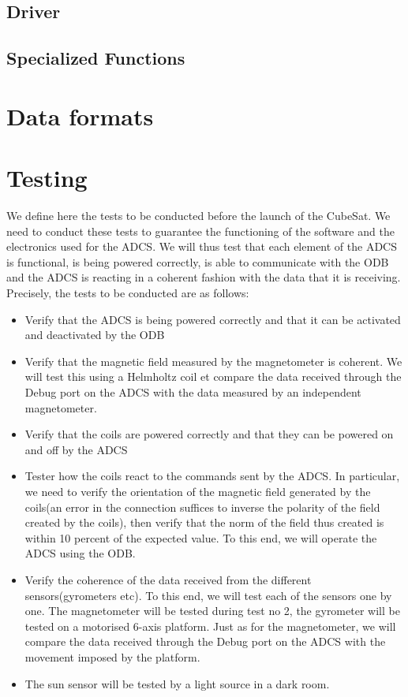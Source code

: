 \documentclass[11pt,a4paper]{report}
\begin{document}
\section{Driver} 

\section{Specialized Functions} 

\chapter{Data formats}\thispagestyle{fancy}

\chapter{Testing}\thispagestyle{fancy} 

We define here the tests to be conducted before the launch of the CubeSat. We need to conduct these tests to guarantee the functioning of the software and the electronics used for the ADCS. We will thus test that each element of the ADCS is functional, is being powered correctly, is able to communicate with the ODB and the ADCS is reacting in a coherent fashion with the data that it is receiving. Precisely, the tests to be conducted are as follows: 


\begin{itemize}
\item 
Verify that the ADCS is being powered correctly and that it can be activated and deactivated by the ODB 
\item 
Verify that the magnetic field measured by the magnetometer is coherent. We will test this using a Helmholtz coil et compare the data received through the Debug port on the ADCS with the data measured by an independent magnetometer. 
\item 
Verify that the coils are powered correctly and that they can be powered on and off by the ADCS 
\item 
Tester how the coils react to the commands sent by the ADCS. In particular, we need to verify the orientation of the magnetic field generated by the coils(an error in the connection suffices to inverse the polarity of the field created by the coils), then verify that the norm of the field thus created is within 10 percent of the expected value. To this end, we will operate the ADCS using the ODB. 
\item 
Verify the coherence of the data received from the different sensors(gyrometers etc). To this end, we will test each of the sensors one by one. The magnetometer will be tested during test no 2, the gyrometer will be tested on a motorised 6-axis platform. Just as for the magnetometer, we will compare the data received through the Debug port on the ADCS with the movement imposed by the platform. 
\item 
The sun sensor will be tested by a light source in a dark room. 
\end{itemize}
\end{document}

